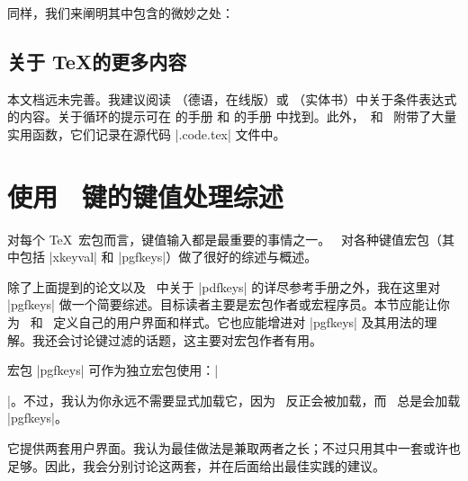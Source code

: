 \documentclass[a4paper,doc2]{ltxdoc}
\begin{document}
同样，我们来阐明其中包含的微妙之处：

\subsection{关于 \TeX 的更多内容}
本文档远未完善。我建议阅读 \cite{schwartz}（德语，在线版）或 \cite{texbook}（实体书）中关于条件表达式的内容。关于循环的提示可在 \PGFPlots 的手册 \cite{pgfplots} 和 \PGF 的手册 \cite{tikz} 中找到。此外，\PGFPlots\ 和 \PGF\ 附带了大量实用函数，它们记录在源代码 |.code.tex| 文件中。

\section{使用 \PGF\ 键的键值处理综述}

对每个 \TeX\ 宏包而言，键值输入都是最重要的事情之一。~\cite{keyvalintro} 对各种键值宏包（其中包括 |xkeyval| 和 |pgfkeys|）做了很好的综述与概述。

除了上面提到的论文以及~\cite{tikz} 中关于 |pdfkeys| 的详尽参考手册之外，我在这里对 |pgfkeys| 做一个简要综述。目标读者主要是宏包作者或宏程序员。本节应能让你为 \PGFPlots\ 和 \PGF\ 定义自己的用户界面和样式。它也应能增进对 |pgfkeys| 及其用法的理解。我还会讨论键过滤的话题，这主要对宏包作者有用。

宏包 |pgfkeys| 可作为独立宏包使用：|\usepackage{pgfkeys}|。不过，我认为你永远不需要显式加载它，因为 \PGF\ 反正会被加载，而 \PGF\ 总是会加载 |pgfkeys|。

它提供两套用户界面。我认为最佳做法是兼取两者之长；不过只用其中一套或许也足够。因此，我会分别讨论这两套，并在后面给出最佳实践的建议。
\end{document}
